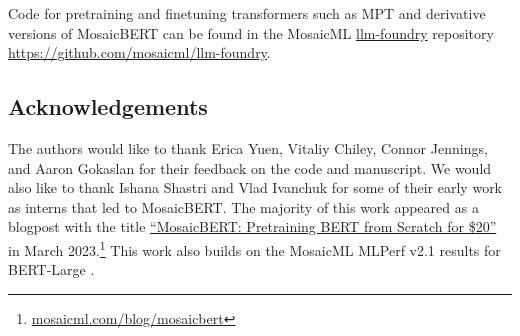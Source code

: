 \documentclass{article}
\newcommand{\beginsupplement}{%
        \setcounter{table}{0}
        \renewcommand{\thetable}{S\arabic{table}}%
        \setcounter{figure}{0}
        \renewcommand{\thefigure}{S\arabic{figure}}%
        \renewcommand{\theHfigure}{Supplement.\thefigure}
     }
\begin{document}
Code for pretraining and finetuning transformers such as MPT and derivative versions of MosaicBERT can be found in the MosaicML \url{llm-foundry} repository \href{https://github.com/mosaicml/llm-foundry}{\url{https://github.com/mosaicml/llm-foundry}}.

\subsection*{Acknowledgements}
The authors would like to thank Erica Yuen, Vitaliy Chiley, Connor Jennings, and Aaron Gokaslan for their feedback on the code and manuscript. We would also like to thank Ishana Shastri and Vlad Ivanchuk for some of their early work as interns that led to MosaicBERT. The majority of this work appeared as a blogpost with the title \href{https://www.mosaicml.com/blog/mosaicbert}{``MosaicBERT: Pretraining BERT from Scratch for \$20''} in March 2023.\footnote{\href{https://www.mosaicml.com/blog/mosaicbert}{\url{mosaicml.com/blog/mosaicbert}}} This work also builds on the MosaicML MLPerf v2.1 results for BERT-Large \citep{mosaicml2022mlperf}.










\newpage





\newpage

\appendix
\beginsupplement


\end{document}
